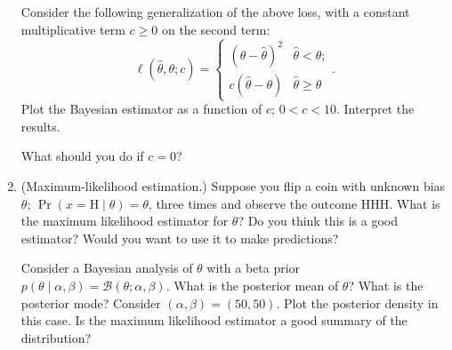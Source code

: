 \documentclass{article}
\newcommand{\given}{\mid}
\newcommand{\mc}[1]{\mathcal{#1}}
\begin{document}
\begin{enumerate}
  Consider the following generalization of the above loss, with a constant
  multiplicative term $c \geq 0$ on the second term:
  \begin{equation*}
    \ell(\hat{\theta}, \theta; c)
    =
    \begin{cases}
      (\theta - \hat{\theta})^2 & \hat{\theta}  <   \theta; \\
      c(\hat{\theta} - \theta)     & \hat{\theta} \geq \theta
    \end{cases}.
  \end{equation*}
  Plot the Bayesian estimator as a function of $c$; $0 < c < 10$.
  Interpret the results.

  What should you do if $c = 0$?

\item
  (Maximum-likelihood estimation.)  Suppose you flip a coin with
  unknown bias $\theta$; $\Pr(x = \text{H} \given \theta) = \theta$,
  three times and observe the outcome HHH.  What is the maximum
  likelihood estimator for $\theta$?  Do you think this is a good
  estimator?  Would you want to use it to make predictions?

  Consider a Bayesian analysis of $\theta$ with a beta prior $p(\theta
  \given \alpha, \beta) = \mc{B}(\theta; \alpha, \beta)$.  What is the
  posterior mean of $\theta$?  What is the posterior mode?  Consider
  $(\alpha, \beta) = (50, 50)$.  Plot the posterior density in this
  case.  Is the maximum likelihood estimator a good summary of the
  distribution?

\end{enumerate}
\end{document}
